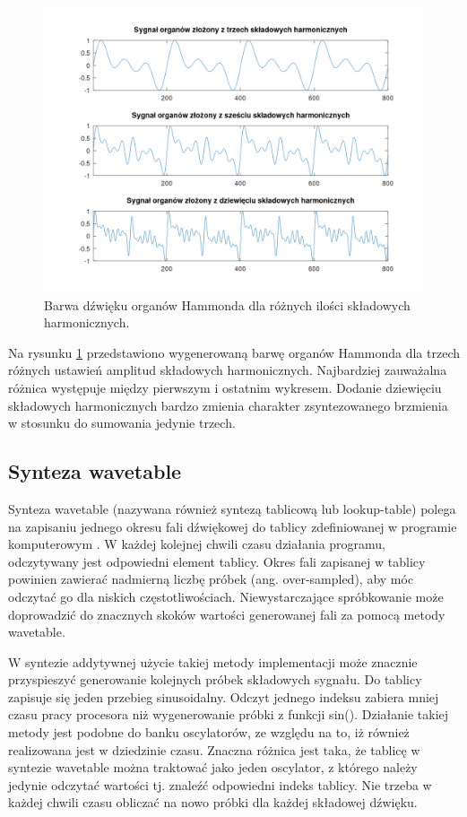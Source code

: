\begin{figure}[H]
	\centering
	\includegraphics[width=15cm]{grafiki/add_hammond_matlab}
	\captionsetup{justification=centering}
	\caption{Barwa dźwięku organów Hammonda dla różnych ilości składowych harmonicznych.}
	\label{rys:add_hammond_matlab}
\end{figure}

Na rysunku \ref{rys:add_hammond_matlab} przedstawiono wygenerowaną barwę organów Hammonda dla trzech różnych ustawień amplitud składowych harmonicznych. Najbardziej zauważalna różnica występuje między pierwszym i ostatnim wykresem. Dodanie dziewięciu składowych harmonicznych bardzo zmienia charakter zsyntezowanego brzmienia w stosunku do sumowania jedynie trzech.


\subsection{Synteza wavetable} \label{add_wavetable}
Synteza wavetable (nazywana również syntezą tablicową lub lookup-table) polega na zapisaniu jednego okresu fali dźwiękowej do tablicy zdefiniowanej w programie komputerowym \cite{add_wavetab_synt}. W każdej kolejnej chwili czasu działania programu, odczytywany jest odpowiedni element tablicy. Okres fali zapisanej w tablicy powinien zawierać nadmierną liczbę próbek (ang. over-sampled), aby móc odczytać go dla niskich częstotliwościach. Niewystarczające spróbkowanie może doprowadzić do znacznych skoków wartości generowanej fali za pomocą metody wavetable.

W syntezie addytywnej użycie takiej metody implementacji może znacznie przyspieszyć generowanie kolejnych próbek składowych sygnału. Do tablicy zapisuje się jeden przebieg sinusoidalny. Odczyt jednego indeksu zabiera mniej czasu pracy procesora niż wygenerowanie próbki z funkcji sin(). Działanie takiej metody jest podobne do banku oscylatorów, ze względu na to, iż również realizowana jest w dziedzinie czasu. Znaczna różnica jest taka, że tablicę w syntezie wavetable można traktować jako jeden oscylator, z którego należy jedynie odczytać wartości tj. znaleźć odpowiedni indeks tablicy. Nie trzeba w każdej chwili czasu obliczać na nowo próbki dla każdej składowej dźwięku.

